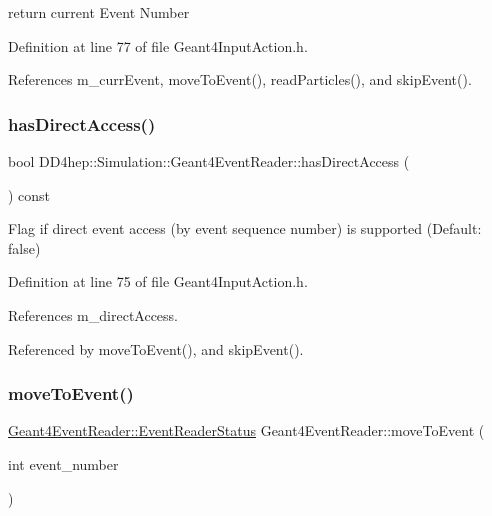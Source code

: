return current Event Number 



Definition at line 77 of file Geant4\+Input\+Action.\+h.



References m\+\_\+curr\+Event, move\+To\+Event(), read\+Particles(), and skip\+Event().

\hypertarget{class_d_d4hep_1_1_simulation_1_1_geant4_event_reader_a4df8c1d610e21df1d887083ca7ff3ffb}{}\label{class_d_d4hep_1_1_simulation_1_1_geant4_event_reader_a4df8c1d610e21df1d887083ca7ff3ffb} 
\subsubsection{\texorpdfstring{has\+Direct\+Access()}{hasDirectAccess()}}
{\footnotesize\ttfamily bool D\+D4hep\+::\+Simulation\+::\+Geant4\+Event\+Reader\+::has\+Direct\+Access (\begin{DoxyParamCaption}{ }\end{DoxyParamCaption}) const\hspace{0.3cm}{\ttfamily [inline]}}



Flag if direct event access (by event sequence number) is supported (Default\+: false) 



Definition at line 75 of file Geant4\+Input\+Action.\+h.



References m\+\_\+direct\+Access.



Referenced by move\+To\+Event(), and skip\+Event().

\hypertarget{class_d_d4hep_1_1_simulation_1_1_geant4_event_reader_a0b6d2fe12ae259534cbe7a5b6e35b642}{}\label{class_d_d4hep_1_1_simulation_1_1_geant4_event_reader_a0b6d2fe12ae259534cbe7a5b6e35b642} 
\subsubsection{\texorpdfstring{move\+To\+Event()}{moveToEvent()}}
{\footnotesize\ttfamily \hyperlink{class_d_d4hep_1_1_simulation_1_1_geant4_event_reader_ae4f4bc83ffcf5b0c1868ad78859851e7}{Geant4\+Event\+Reader\+::\+Event\+Reader\+Status} Geant4\+Event\+Reader\+::move\+To\+Event (\begin{DoxyParamCaption}\item[{int}]{event\+\_\+number }\end{DoxyParamCaption})\hspace{0.3cm}{\ttfamily [virtual]}}



